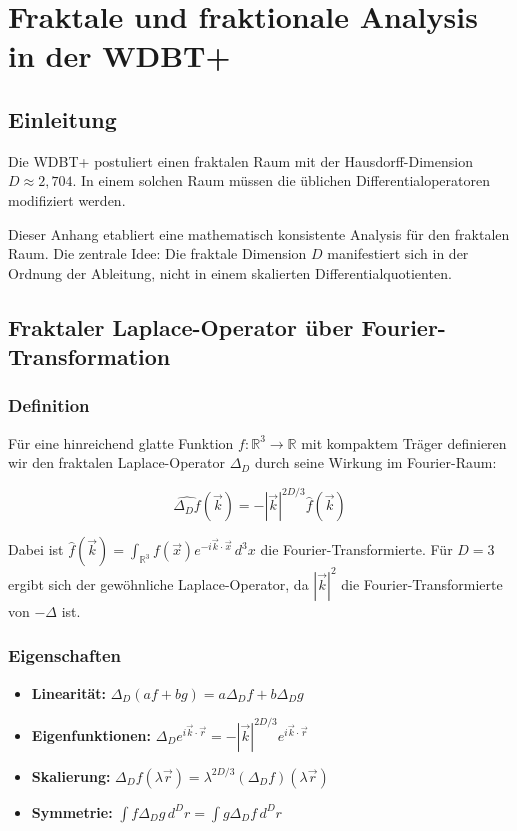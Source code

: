 \chapter{Fraktale und fraktionale Analysis in der WDBT+}

\section{Einleitung}

Die WDBT+ postuliert einen fraktalen Raum mit der Hausdorff-Dimension 
\( D \approx 2,704 \). In einem solchen Raum müssen die üblichen Differentialoperatoren 
modifiziert werden.

Dieser Anhang etabliert eine mathematisch konsistente Analysis für den fraktalen Raum.
Die zentrale Idee: Die fraktale Dimension \( D \) manifestiert sich in der Ordnung 
der Ableitung, nicht in einem skalierten Differentialquotienten.

\section{Fraktaler Laplace-Operator über Fourier-Transformation}

\subsection{Definition}

Für eine hinreichend glatte Funktion \( f: \mathbb{R}^3 \to \mathbb{R} \) mit kompaktem 
Träger definieren wir den fraktalen Laplace-Operator \( \Delta_D \) durch seine Wirkung 
im Fourier-Raum:

\[
\widehat{\Delta_D f}(\vec{k}) = -|\vec{k}|^{2D/3} \hat{f}(\vec{k})
\]

Dabei ist \( \hat{f}(\vec{k}) = \int_{\mathbb{R}^3} f(\vec{x}) e^{-i\vec{k}\cdot\vec{x}} \, d^3x \)
die Fourier-Transformierte. Für \( D = 3 \) ergibt sich der gewöhnliche Laplace-Operator,
da \( |\vec{k}|^{2} \) die Fourier-Transformierte von \( -\Delta \) ist.

\subsection{Eigenschaften}

\begin{itemize}
    \item \textbf{Linearität:} \( \Delta_D(af + bg) = a\Delta_D f + b\Delta_D g \)
    \item \textbf{Eigenfunktionen:} \( \Delta_D e^{i\vec{k}\cdot\vec{r}} = -|\vec{k}|^{2D/3} e^{i\vec{k}\cdot\vec{r}} \)
    \item \textbf{Skalierung:} \( \Delta_D f(\lambda\vec{r}) = \lambda^{2D/3} (\Delta_D f)(\lambda\vec{r}) \)
    \item \textbf{Symmetrie:} \( \int f \Delta_D g \, d^Dr = \int g \Delta_D f \, d^Dr \)
\end{itemize}

